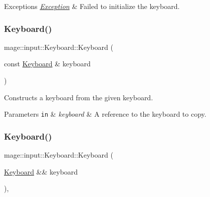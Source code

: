 \begin{DoxyExceptions}{Exceptions}
{\em \hyperlink{classmage_1_1_exception}{Exception}} & Failed to initialize the keyboard. \\
\hline
\end{DoxyExceptions}
\hypertarget{classmage_1_1input_1_1_keyboard_ae7297c3080b0e6f78e37cf94ce3effcb}{}\label{classmage_1_1input_1_1_keyboard_ae7297c3080b0e6f78e37cf94ce3effcb} 
\subsubsection{\texorpdfstring{Keyboard()}{Keyboard()}\hspace{0.1cm}{\footnotesize\ttfamily [2/3]}}
{\footnotesize\ttfamily mage\+::input\+::\+Keyboard\+::\+Keyboard (\begin{DoxyParamCaption}\item[{const \hyperlink{classmage_1_1input_1_1_keyboard}{Keyboard} \&}]{keyboard }\end{DoxyParamCaption})\hspace{0.3cm}{\ttfamily [delete]}}

Constructs a keyboard from the given keyboard.


\begin{DoxyParams}[1]{Parameters}
\mbox{\tt in}  & {\em keyboard} & A reference to the keyboard to copy. \\
\hline
\end{DoxyParams}
\hypertarget{classmage_1_1input_1_1_keyboard_adb93a42b959d58fc320215157f85854c}{}\label{classmage_1_1input_1_1_keyboard_adb93a42b959d58fc320215157f85854c} 
\subsubsection{\texorpdfstring{Keyboard()}{Keyboard()}\hspace{0.1cm}{\footnotesize\ttfamily [3/3]}}
{\footnotesize\ttfamily mage\+::input\+::\+Keyboard\+::\+Keyboard (\begin{DoxyParamCaption}\item[{\hyperlink{classmage_1_1input_1_1_keyboard}{Keyboard} \&\&}]{keyboard }\end{DoxyParamCaption})\hspace{0.3cm}{\ttfamily [default]}, {\ttfamily [noexcept]}}

